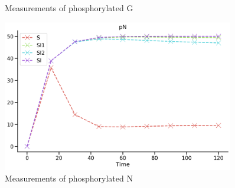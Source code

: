\documentclass[../../main]{subfiles}
\begin{document}
\begin{figure}
\begin{minipage}{0.45\textwidth}
            \caption{Measurements of phosphorylated G}
        \end{minipage}\hfill
        \begin{minipage}{0.45\textwidth}
            \centering
            \includegraphics[width=0.9\textwidth]{ODEModels/PracticeProject/pN.png} %
            \caption{Measurements of phosphorylated N}
        \end{minipage}
    \end{figure}
\end{document}
